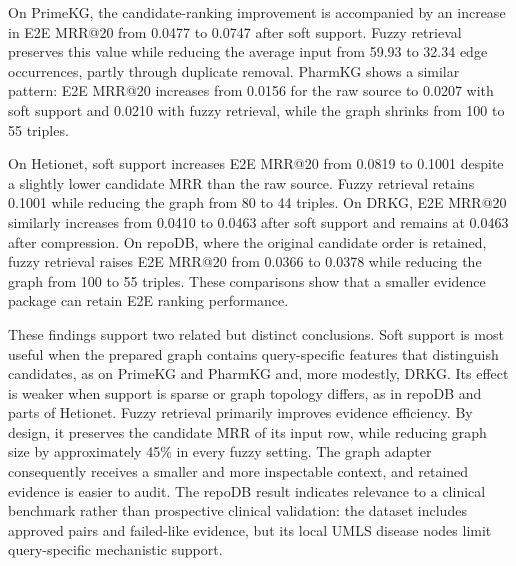 \documentclass[pdflatex,sn-mathphys-num]{sn-jnl}
\begin{document}
\begin{revisionblock}
On PrimeKG, the candidate-ranking improvement is accompanied by an increase in E2E MRR@20 from 0.0477 to 0.0747 after soft support. Fuzzy retrieval preserves this value while reducing the average input from 59.93 to 32.34 edge occurrences, partly through duplicate removal. PharmKG shows a similar pattern: E2E MRR@20 increases from 0.0156 for the raw source to 0.0207 with soft support and 0.0210 with fuzzy retrieval, while the graph shrinks from 100 to 55 triples.
\end{revisionblock}



\begin{revisionblock}
On Hetionet, soft support increases E2E MRR@20 from 0.0819 to 0.1001 despite a slightly lower candidate MRR than the raw source. Fuzzy retrieval retains 0.1001 while reducing the graph from 80 to 44 triples. On DRKG, E2E MRR@20 similarly increases from 0.0410 to 0.0463 after soft support and remains at 0.0463 after compression. On repoDB, where the original candidate order is retained, fuzzy retrieval raises E2E MRR@20 from 0.0366 to 0.0378 while reducing the graph from 100 to 55 triples. These comparisons show that a smaller evidence package can retain E2E ranking performance.
\end{revisionblock}


These findings support two related but distinct conclusions. Soft support is most useful when the prepared graph contains query-specific features that distinguish candidates, as on PrimeKG and PharmKG and, more modestly, DRKG. Its effect is weaker when support is sparse or graph topology differs, as in repoDB and parts of Hetionet. Fuzzy retrieval primarily improves evidence efficiency. By design, it preserves the candidate MRR of its input row, while reducing graph size by approximately 45\% in every fuzzy setting. The graph adapter consequently receives a smaller and more inspectable context, and retained evidence is easier to audit. The repoDB result indicates relevance to a clinical benchmark rather than prospective clinical validation: the dataset includes approved pairs and failed-like evidence, but its local UMLS disease nodes limit query-specific mechanistic support.



\end{document}

